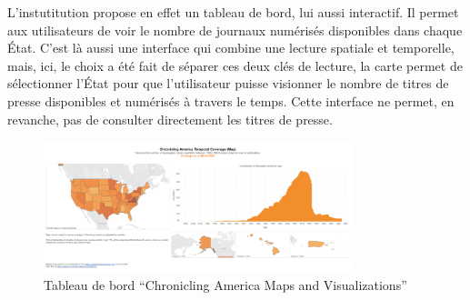 L'instutitution propose en effet un tableau de bord, lui aussi interactif. Il permet aux utilisateurs de voir le nombre de journaux numérisés disponibles dans chaque État. C’est là aussi une interface qui combine une lecture spatiale et temporelle, mais, ici, le choix a été fait de séparer ces deux clés de lecture, la carte permet de sélectionner l’État pour que l’utilisateur puisse visionner le nombre de titres de presse disponibles et numérisés à travers le temps. Cette interface ne permet, en revanche, pas de consulter directement les titres de presse.


\begin{figure}[h!]
	\centering
	\includegraphics[width=0.8\textwidth]{images/image15.png}
	\caption{Tableau de bord \enquote{Chronicling America Maps and Visualizations}}
	\label{fig:image15}
\end{figure}



